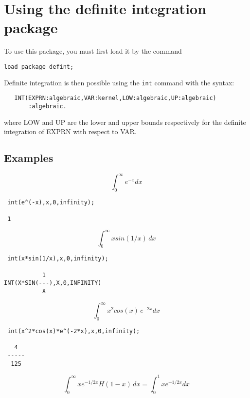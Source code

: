\section{Using the definite integration package}
To use this package, you must first load it by the command
\begin{verbatim}
load_package defint;
\end{verbatim}
Definite integration is then possible using the \verb+int+
command with the syntax:
\begin{verbatim}
   INT(EXPRN:algebraic,VAR:kernel,LOW:algebraic,UP:algebraic)
       :algebraic.
\end{verbatim}
where LOW and UP are the lower and upper bounds respectively for
the definite integration of EXPRN with respect to VAR.

\subsection{Examples}

\begin{displaymath}
\int_{0}^{\infty} e^{-x} dx 
\end{displaymath}


\begin{verbatim}
 int(e^(-x),x,0,infinity);

 1
\end{verbatim}

\begin{displaymath}
\int_{0}^{\infty} x sin(1/x) \, dx
\end{displaymath}

\begin{verbatim}
 int(x*sin(1/x),x,0,infinity);

           1
INT(X*SIN(---),X,0,INFINITY)
           X
\end{verbatim}

\begin{displaymath}
\int_{0}^{\infty} x^2 cos(x) \, e^{-2x} dx
\end{displaymath}

\begin{verbatim}
 int(x^2*cos(x)*e^(-2*x),x,0,infinity);

   4
 -----
  125
\end{verbatim}

\begin{displaymath}
\int_{0}^{\infty} x e^{-1/2x} H(1-x) \,dx = \int_{0}^{1} x e^{-1/2x} dx
\end{displaymath}

